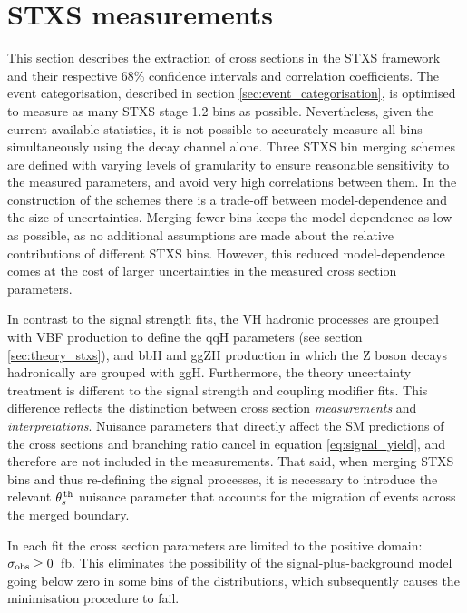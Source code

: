 \section{STXS measurements}\label{sec:results_STXS}
This section describes the extraction of cross sections in the STXS framework and their respective 68\% confidence intervals and correlation coefficients. The event categorisation, described in section \ref{sec:event_categorisation}, is optimised to measure as many STXS stage 1.2 bins as possible. Nevertheless, given the current available statistics, it is not possible to accurately measure all bins simultaneously using the \Hgg decay channel alone. Three STXS bin merging schemes are defined with varying levels of granularity to ensure reasonable sensitivity to the measured parameters, and avoid very high correlations between them. In the construction of the schemes there is a trade-off between model-dependence and the size of uncertainties. Merging fewer bins keeps the model-dependence as low as possible, as no additional assumptions are made about the relative contributions of different STXS bins. However, this reduced model-dependence comes at the cost of larger uncertainties in the measured cross section parameters.

In contrast to the signal strength fits, the VH hadronic processes are grouped with VBF production to define the qqH parameters (see section \ref{sec:theory_stxs}), and bbH and ggZH production in which the Z boson decays hadronically are grouped with ggH. Furthermore, the theory uncertainty treatment is different to the signal strength and coupling modifier fits. This difference reflects the distinction between cross section \textit{measurements} and \textit{interpretations}. Nuisance parameters that directly affect the SM predictions of the cross sections and branching ratio cancel in equation \ref{eq:signal_yield}, and therefore are not included in the measurements. That said, when merging STXS bins and thus re-defining the signal processes, it is necessary to introduce the relevant $\theta^{\,\rm{th}}_{s}$ nuisance parameter that accounts for the migration of events across the merged boundary. 

In each fit the cross section parameters are limited to the positive domain: $\sigma_{\rm{obs}}\geq0$~fb. This eliminates the possibility of the signal-plus-background model going below zero in some bins of the \mgg distributions, which subsequently causes the minimisation procedure to fail.

